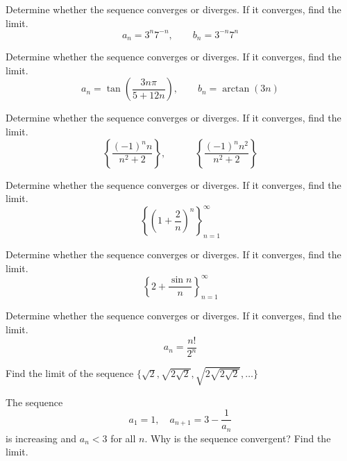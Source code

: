 \documentclass[
  course = {{MATH102 Calculus II}},
  quartile = {{2}},
  assignment = {{Sections 11.1}},%
  topic = {{Sequences}},
  firstexercise = 1,
  term = 203
]{../class/aga-homework}
\begin{document}
\newpage


\problem Determine whether the sequence converges or diverges. If it converges, find the limit.
\[
a_n=3^n7^{-n}, \qquad b_n=3^{-n}7^{n}
\]
\newpage

\problem Determine whether the sequence converges or diverges. If it converges, find the limit.
\[
a_n=\tan\left(\frac{3n\pi}{5+12n}\right), \qquad b_n=\arctan(3n)
\]
\newpage

\problem Determine whether the sequence converges or diverges. If it converges, find the limit.
\[
\left\{\frac{(-1)^{n}n}{n^2+2}\right\}, \qquad \quad \left\{\frac{(-1)^{n}n^2}{n^2+2}\right\}
\]
\newpage

\problem Determine whether the sequence converges or diverges. If it converges, find the limit.
\[
\left\{\left(1+\frac{2}{n}\right)^n\right\}_{n=1}^{\infty}
\]
\newpage

\problem Determine whether the sequence converges or diverges. If it converges, find the limit.
\[
\left\{2+\frac{\sin n}{n}\right\}_{n=1}^{\infty}
\]
\newpage

\problem Determine whether the sequence converges or diverges. If it converges, find the limit.
\[
a_n=\frac{n!}{2^n}
\]
\newpage

\problem Find the limit of the sequence $\displaystyle \{\sqrt{2}, \sqrt{2\sqrt{2}}, \sqrt{2\sqrt{2\sqrt{2}}}, \dots\}$
\newpage


\problem The sequence
\[a_1=1, \quad a_{n+1}=3-\frac{1}{a_n}\]
is increasing and $a_n<3$ for all $n$. Why is the sequence convergent? Find the limit.
\afterpage{\null\newpage}

\afterpage{\null\newpage}
\afterpage{\null\newpage}
\end{document}
